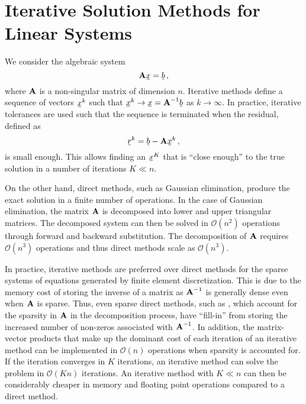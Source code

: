 \documentclass[../doc.tex]{subfiles}
\begin{document}
\section{Iterative Solution Methods for Linear Systems}
We consider the algebraic system 
	\begin{equation}
		\mat{A} \ubar{x} = \ubar{b} \,, 
	\end{equation}
where $\boldsymbol{\mathrm{A}}$ is a non-singular matrix of dimension $n$. Iterative methods define a sequence of vectors $\ubar{x}^k$ such that $\ubar{x}^k \rightarrow \ubar{x} = \mat{A}^{-1} \ubar{b}$ as $k\rightarrow \infty$. In practice, iterative tolerances are used such that the sequence is terminated when the residual, defined as 
	\begin{equation} \label{fem:residual_vec}
		\ubar{r}^k = \ubar{b} - \mat{A}\ubar{x}^k \,,
	\end{equation}
is small enough. This allows finding an $\ubar{x}^K$ that is ``close enough'' to the true solution in a number of iterations $K\ll n$. 

On the other hand, direct methods, such as Gaussian elimination, produce the exact solution in a finite number of operations. In the case of Gaussian elimination, the matrix $\boldsymbol{\mathrm{A}}$ is decomposed into lower and upper triangular matrices. The decomposed system can then be solved in $\mathcal{O}(n^2)$ operations through forward and backward substitution. The decomposition of $\boldsymbol{\mathrm{A}}$ requires $\mathcal{O}(n^3)$ operations and thus direct methods scale as $\mathcal{O}(n^3)$. 

In practice, iterative methods are preferred over direct methods for the sparse systems of equations generated by finite element discretization. This is due to the memory cost of storing the inverse of a matrix as $\boldsymbol{\mathrm{A}}^{-1}$ is generally dense even when $\boldsymbol{\mathrm{A}}$ is sparse. 
Thus, even sparse direct methods, such as \textcite{lidemmel03}, which account for the sparsity in $\boldsymbol{\mathrm{A}}$ in the decomposition process, have ``fill-in'' from storing the increased number of non-zeros associated with $\boldsymbol{\mathrm{A}}^{-1}$. In addition, the matrix-vector products that make up the dominant cost of each iteration of an iterative method can be implemented in $\mathcal{O}(n)$ operations when sparsity is accounted for. If the iteration converges in $K$ iterations, an iterative method can solve the problem in $\mathcal{O}(Kn)$ iterations. An iterative method with $K \ll n$ can then be considerably cheaper in memory and floating point operations compared to a direct method. 
\end{document}
